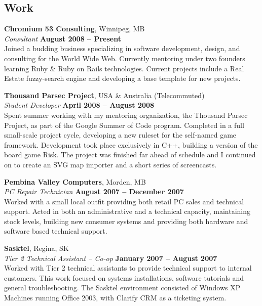 \documentclass[margin,line,letterpaper]{resume}
\begin{document}
\begin{resume}
  \section{\mysidestyle Work}

  {\bf Chromium 53 Consulting}, Winnipeg, MB \vspace{2mm}\\\vspace{1mm}%
  {\sl Consultant} \hfill {\bf August 2008 -- Present}\\
  Joined a budding business specializing in software development, design, and
  consulting for the World Wide Web. Currently mentoring under two founders learning Ruby \& Ruby on Rails technologies. Current projects include a Real Estate fuzzy-search engine and developing a base template for new projects.

{\bf Thousand Parsec Project}, USA \& Australia (Telecommuted) \vspace{2mm}\\\vspace{1mm}%
  {\sl Student Developer } \hfill {\bf April 2008 -- August 2008}\\
  Spent summer working with my mentoring organization, the Thousand Parsec Project, as part of the Google Summer of Code program. Completed in a full small-scale project cycle, developing a new ruleset for the self-named game framework. Development took place exclusively in C++, building a version of the board game Risk. The project was finished far ahead of schedule and I continued on to create an SVG map importer and a short series of screencasts.

  {\bf Pembina Valley Computers}, Morden, MB \vspace{2mm}\\\vspace{1mm}%
  {\sl PC Repair Technician} \hfill {\bf August 2007 -- December 2007}\\
  Worked with a small local outfit providing both retail PC sales and technical support. Acted in both an administrative and a technical capacity, maintaining stock levels, building new consumer systems and providing both hardware and software based technical support.

  {\bf Sasktel}, Regina, SK \vspace{2mm}\\\vspace{1mm}%
  {\sl Tier 2 Technical Assistant -- Co-op} \hfill {\bf January 2007 -- August 2007}\\
  Worked with Tier 2 technical assistants to provide technical support to internal customers. This work focused on systems installations, software tutorials and general troubleshooting. The Sasktel environment consisted of Windows XP Machines running Office 2003, with Clarify CRM as a ticketing system.


\end{resume}
\end{document}
